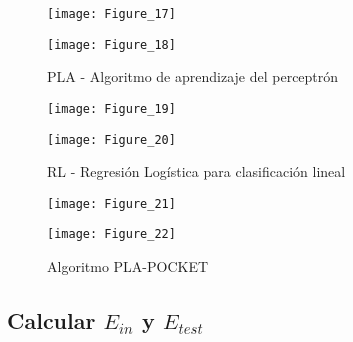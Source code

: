 \begin{figure}[H]
    \caption{PLA - Algoritmo de aprendizaje del perceptrón\medskip}
    \begin{minipage}[b]{.5\linewidth}
      \centering
      \texttt{[image: Figure\_17]}
       \label{subfig-5:dummy63}
    \end{minipage}
    \hfill \hfill
    \begin{minipage}[b]{.5\linewidth}
      \centering
      \texttt{[image: Figure\_18]}
    \end{minipage}
    \label{fig:dummy63}
\end{figure}

\begin{figure}[H]
    \caption{RL - Regresión Logística para clasificación lineal\medskip}
    \begin{minipage}[b]{.5\linewidth}
      \centering
      \texttt{[image: Figure\_19]}
       \label{subfig-5:dummy64}
    \end{minipage}
    \hfill \hfill
    \begin{minipage}[b]{.5\linewidth}
      \centering
      \texttt{[image: Figure\_20]}
    \end{minipage}
    \label{fig:dummy64}
\end{figure}

\begin{figure}[H]
    \caption{Algoritmo PLA-POCKET \medskip}
    \begin{minipage}[b]{.5\linewidth}
      \centering
      \texttt{[image: Figure\_21]}
       \label{subfig-5:dummy65}
    \end{minipage}
    \hfill \hfill
    \begin{minipage}[b]{.5\linewidth}
      \centering
      \texttt{[image: Figure\_22]}
    \end{minipage}
    \label{fig:dummy65}
\end{figure}

\subsection{Calcular $E_{in}$ y $E_{test}$}

